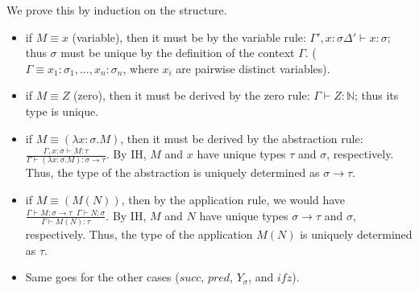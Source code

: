     We prove this by induction on the structure.
    \begin{itemize}
        \item if $M \equiv x$ (variable), then it must be by the variable rule: $\Gamma', x:\sigma \Delta' \vdash x:\sigma$; thus $\sigma$ must be unique by the definition of the context $\Gamma$.
                ($\Gamma \equiv x_1:\sigma_1, ..., x_n:\sigma_n$, where $x_i$ are pairwise distinct variables).
        
        \item if $M \equiv Z$ (zero), then it must be derived by the zero rule: $\Gamma \vdash Z:\mathbb{N}$; thus its type is unique.
        
        \item if $M \equiv (\lambda x:\sigma.M)$, then it must be derived by the abstraction rule: $\frac{\Gamma, x:\sigma \vdash M:\tau}{\Gamma \vdash (\lambda x:\sigma.M):\sigma \to \tau}$.
                By IH, $M$ and $x$ have unique types $\tau$ and $\sigma$, respectively. Thus, the type of the abstraction is uniquely determined as $\sigma \to \tau$.
                
        \item if $M \equiv (M(N))$, then by the application rule, we would have $\frac{\Gamma \vdash M:\sigma \to \tau \;\; \Gamma \vdash N:\sigma}{\Gamma \vdash M(N) : \tau}$.
                By IH, $M$ and $N$ have unique types $\sigma \to \tau$ and $\sigma$, respectively. Thus, the type of the application $M(N)$ is uniquely determined as $\tau$.

        \item Same goes for the other cases ($succ$, $pred$, $Y_\sigma$, and $ifz$).
    \end{itemize}